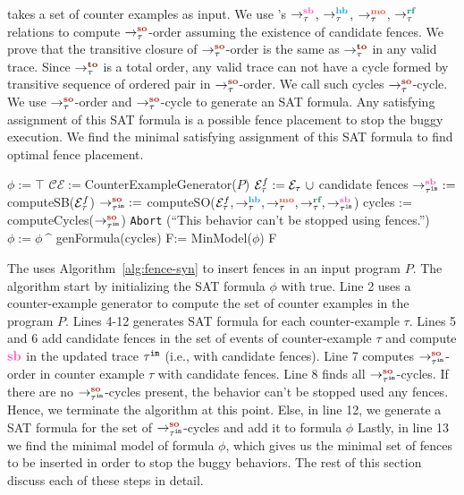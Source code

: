 \ourtechnique takes a set of counter examples as input.
We use \cc 's $\setSB$, $\setHB$, $\setMO$, $\setRF$ relations to compute 
$ \setSO $-order assuming the existence of candidate fences.
We prove that the transitive closure of $ \setSO $-order is the same as 
$ \setTO $ in any valid \cc trace. 
Since $ \setTO $ is a total order, any valid \cc trace can not have a 
cycle formed by transitive sequence of ordered pair in $ \setSO $-order. 
We call such cycles $\setSO$-cycle. 
We use $ \setSO $-order and $ \setSO $-cycle to generate an SAT formula. 
Any satisfying assignment of this SAT formula is a possible fence 
placement to stop the buggy execution. We find the minimal satisfying assignment of this SAT formula to find optimal fence placement. 

\begin{algorithm}
	\caption{\ourtechnique}
	\begin{algorithmic}[1]	
		\State $\phi := \top$
		\State $ \mathcal{CE} := $CounterExampleGenerator($P$)
			\State $ \events_\tau^f := \events_\tau\ \union $ candidate fences
			\State $ \seqb{\tau^{\mathtt{im}}}{}{} := $ computeSB($\mathcal{E}_\tau^f$) \State $ \so{\tau^{\mathtt{im}}}{}{} := $ computeSO($\events_\tau^f, \setHB, \setMO, \setRF, \seqb{\im{\tau}}{}{}$)
			\State cycles := computeCycles($ \so{\im{\tau}}{}{} $)
				\State \texttt{Abort} (``This behavior can't be stopped using \cc fences.'')
				\State \Return
			\EndIf
			\State $\phi := \phi\ \^ $ genFormula(cycles)
		\EndFor
		\State F:= MinModel($ \phi $)
		\State \Return F
%		
		\EndProcedure
		\label{alg:fence-syn}
	\end{algorithmic}
\end{algorithm}

The \ourtool uses Algorithm~\ref{alg:fence-syn} to insert fences in an 
input program $ P $. The algorithm start by initializing the 
SAT formula $ \phi $ with true.  Line 2 uses a counter-example generator 
to compute the set of counter examples in the program $ P $. 
Lines 4-12 generates SAT formula for each counter-example $ \tau $.
Lines 5 and 6 add candidate fences in the set of events of counter-example 
$ \tau $ and compute $ \lsb $ in the updated trace $ {\tau}^{\mathtt{im}} $ (i.e., with candidate 
fences). 
Line 7 computes $ \so{\im{\tau}}{}{} $-order in counter example $ \tau $ with candidate fences.
Line 8 finds all $ \so{\im{\tau}}{}{} $-cycles. If there are no $ \so{\im{\tau}}{}{} $-cycles 
present, the behavior can't be stopped used any \cc fences. Hence, we 
terminate the algorithm at this point.
Else, in line 12, we generate a SAT formula for the set of $ \so{\im{\tau}}{}{} $-cycles and add it to formula $ \phi $
Lastly, in line 13 we find the minimal model of formula $ \phi $, which 
gives us the minimal set of fences to be inserted in order to stop the 
buggy behaviors.
The rest of this section discuss each of these steps in detail.

